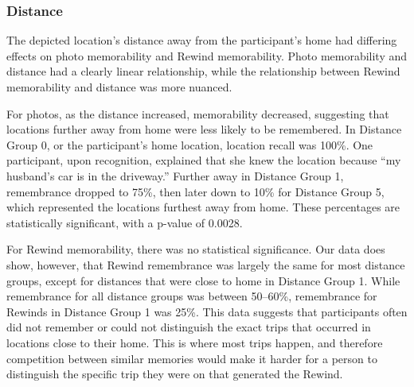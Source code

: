 \documentclass{sigchi}
\begin{document}
\subsubsection{Distance}
The depicted location's distance away from the participant’s home had differing effects on photo memorability and Rewind memorability. Photo memorability and distance had a clearly linear relationship, while the relationship between Rewind memorability and distance was more nuanced. 

For photos, as the distance increased, memorability decreased, suggesting that locations further away from home were less likely to be remembered. In Distance Group 0, or the participant's home location, location recall was 100\%. One participant, upon recognition, explained that she knew the location because ``my husband's car is in the driveway.'' Further away in Distance Group 1, remembrance dropped to 75\%, then later down to 10\% for Distance Group 5, which represented the locations furthest away from home. These percentages are statistically significant, with a p-value of 0.0028. 

For Rewind memorability, there was no statistical significance. Our data does show, however, that Rewind remembrance was largely the same for most distance groups, except for distances that were close to home in Distance Group 1. While remembrance for all distance groups was between 50--60\%, remembrance for Rewinds in Distance Group 1 was 25\%. This data suggests that participants often did not remember or could not distinguish the exact trips that occurred in locations close to their home. This is where most trips happen, and therefore competition between similar memories would make it harder for a person to distinguish the specific trip they were on that generated the Rewind.
\end{document}

